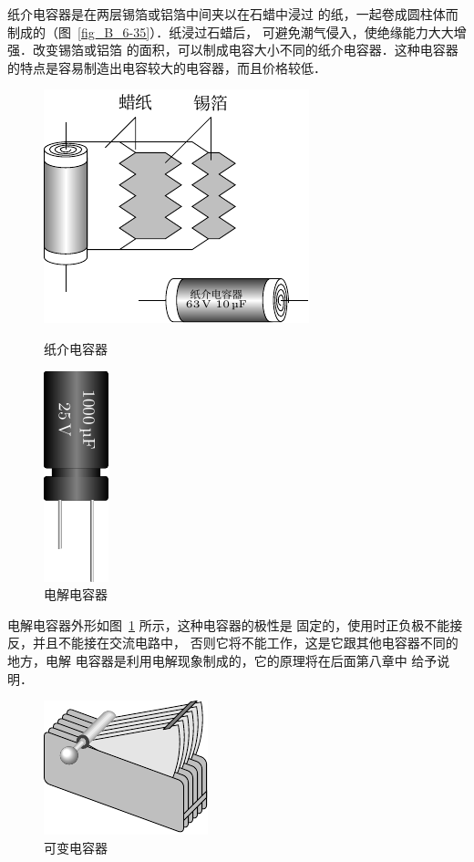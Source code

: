 纸介电容器是在两层锡箔或铝箔中间夹以在石蜡中浸过
的纸，一起卷成圆柱体而制成的（图~\ref{fig_B_6-35}）．纸浸过石蜡后，
可避免潮气侵入，使绝缘能力大大增强．改变锡箔或铝箔
的面积，可以制成电容大小不同的纸介电容器．这种电容器
的特点是容易制造出电容较大的电容器，而且价格较低．
\begin{figure}[htbp]
    \centering
    \begin{minipage}[t]{0.48\textwidth}
        \centering
        \includegraphics{fig/B/6-35.pdf}
        \caption{纸介电容器}\label{fig_B_6-35}
    \end{minipage}
    \begin{minipage}[t]{0.48\textwidth}
        \centering
        \includegraphics{fig/B/6-36.pdf}
        \caption{电解电容器}\label{fig_B_6-36}
    \end{minipage}
\end{figure}

电解电容器外形如图~\ref{fig_B_6-36} 所示，这种电容器的极性是
固定的，使用时正负极不能接反，并且不能接在交流电路中，
否则它将不能工作，这是它跟其他电容器不同的地方，电解
电容器是利用电解现象制成的，它的原理将在后面第八章中
给予说明．
\begin{figure}[htbp]
    \centering
    \includegraphics{fig/B/6-37.pdf}
    \caption{可变电容器}\label{fig_B_6-37}
\end{figure}

